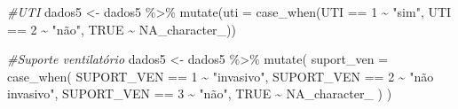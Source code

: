 \documentclass[
]{article}
\newenvironment{Shaded}{\begin{snugshade}}{\end{snugshade}}
\newcommand{\AttributeTok}[1]{\textcolor[rgb]{0.77,0.63,0.00}{#1}}
\newcommand{\CommentTok}[1]{\textcolor[rgb]{0.56,0.35,0.01}{\textit{#1}}}
\newcommand{\ConstantTok}[1]{\textcolor[rgb]{0.00,0.00,0.00}{#1}}
\newcommand{\DecValTok}[1]{\textcolor[rgb]{0.00,0.00,0.81}{#1}}
\newcommand{\FunctionTok}[1]{\textcolor[rgb]{0.00,0.00,0.00}{#1}}
\newcommand{\NormalTok}[1]{#1}
\newcommand{\OtherTok}[1]{\textcolor[rgb]{0.56,0.35,0.01}{#1}}
\newcommand{\SpecialCharTok}[1]{\textcolor[rgb]{0.00,0.00,0.00}{#1}}
\newcommand{\StringTok}[1]{\textcolor[rgb]{0.31,0.60,0.02}{#1}}
\begin{document}
\begin{Shaded}
\begin{Highlighting}[]
\CommentTok{\#UTI}
\NormalTok{dados5 }\OtherTok{\textless{}{-}}\NormalTok{ dados5 }\SpecialCharTok{\%\textgreater{}\%}
  \FunctionTok{mutate}\NormalTok{(}\AttributeTok{uti =} \FunctionTok{case\_when}\NormalTok{(UTI }\SpecialCharTok{==} \DecValTok{1} \SpecialCharTok{\textasciitilde{}} \StringTok{"sim"}\NormalTok{,}
\NormalTok{                         UTI }\SpecialCharTok{==} \DecValTok{2} \SpecialCharTok{\textasciitilde{}} \StringTok{"não"}\NormalTok{,}
                         \ConstantTok{TRUE} \SpecialCharTok{\textasciitilde{}} \ConstantTok{NA\_character\_}\NormalTok{))}

\CommentTok{\#Suporte ventilatório}
\NormalTok{dados5 }\OtherTok{\textless{}{-}}\NormalTok{ dados5 }\SpecialCharTok{\%\textgreater{}\%}
  \FunctionTok{mutate}\NormalTok{(}
    \AttributeTok{suport\_ven =} \FunctionTok{case\_when}\NormalTok{(}
\NormalTok{      SUPORT\_VEN }\SpecialCharTok{==} \DecValTok{1} \SpecialCharTok{\textasciitilde{}} \StringTok{"invasivo"}\NormalTok{,}
\NormalTok{      SUPORT\_VEN }\SpecialCharTok{==} \DecValTok{2} \SpecialCharTok{\textasciitilde{}} \StringTok{"não invasivo"}\NormalTok{,}
\NormalTok{      SUPORT\_VEN }\SpecialCharTok{==} \DecValTok{3} \SpecialCharTok{\textasciitilde{}} \StringTok{"não"}\NormalTok{,}
      \ConstantTok{TRUE} \SpecialCharTok{\textasciitilde{}} \ConstantTok{NA\_character\_}
\NormalTok{    )}
\NormalTok{  )}


\end{Highlighting}
\end{Shaded}
\end{document}
